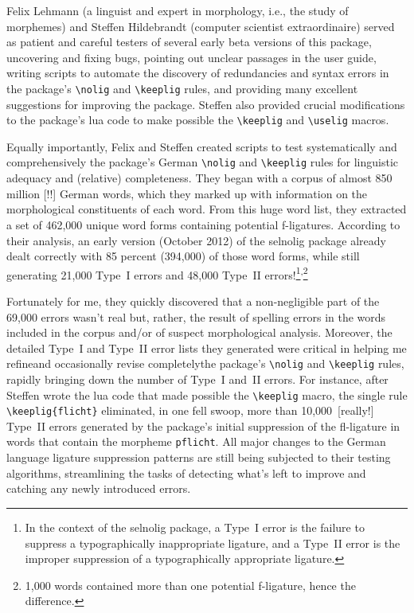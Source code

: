 \documentclass[11pt]{article}
\newcommand{\pkg}[1]{\textsf{#1}}
\newcommand{\opt}[1]{\texttt{#1}}
\newcommand{\cmmd}[1]{\texttt{\textbackslash #1}}
\begin{document}
Felix Lehmann (a linguist and expert in morphology, i.e., the study of morphemes) and Steffen Hildebrandt (computer scientist extraordinaire) served as patient and careful testers of several early beta versions of this package, uncovering and fixing bugs, pointing out unclear passages in the user guide, writing scripts to automate the discovery of redundancies and syntax errors in the package's \cmmd{nolig} and \cmmd{keeplig} rules, and providing many excellent suggestions for improving the package. Steffen also provided crucial modifications to the package's lua code to make possible the \cmmd{keeplig} and \cmmd{uselig} macros.

Equally importantly, Felix and Steffen created scripts to test systematically and comprehensively the package's German \cmmd{nolig} and \cmmd{keeplig} rules for linguistic adequacy and (relative) completeness.
They began with a corpus of almost 850 million [!!] German words, which they marked up with information on the morphological constituents of each word. From this huge word list, they extracted a set of 462,000 unique word forms containing potential f-ligatures.
According to their analysis, an early version (October 2012) of the \pkg{selnolig} package already dealt correctly with 85 percent (394,000) of those word forms, while still generating 21,000 Type~I errors and 48,000 Type~II errors!\footnote{In the context of the \pkg{selnolig} package, a Type~I error is the failure to suppress a typographically inappropriate ligature, and a Type~II error is the improper suppression of a typographically appropriate ligature.}\textsuperscript{,}\footnote{1,000 words contained more than one potential f-ligature, hence the difference.} 

Fortunately for me, they quickly discovered that a non-negligible part of the 69,000 errors wasn't real but, rather, the result of spelling errors in the words included in the corpus and/or of suspect morphological analysis. Moreover, the detailed Type~I and Type~II error lists they generated were critical in helping me refine\textemdash and occasionally revise completely\textemdash the package's \cmmd{nolig} and \cmmd{keeplig} rules, rapidly bringing down the number of Type~I and~II errors. For instance, after Steffen wrote the lua code that made possible the \cmmd{keeplig} macro, the single rule \Verb+\keeplig{flicht}+ eliminated, in one fell swoop, more than 10,000~[really!] Type~II errors generated by the package's initial suppression of the fl-ligature in words that contain the morpheme \opt{pflicht}. All major changes to the German language ligature suppression patterns are still being subjected to their testing algorithms, streamlining the tasks of detecting what's left to improve and catching any newly introduced errors.
\end{document}
